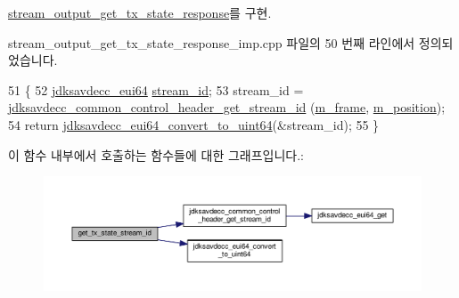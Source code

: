 \hyperlink{classavdecc__lib_1_1stream__output__get__tx__state__response_a70413bbd0422049658122c5103e0d948}{stream\+\_\+output\+\_\+get\+\_\+tx\+\_\+state\+\_\+response}를 구현.



stream\+\_\+output\+\_\+get\+\_\+tx\+\_\+state\+\_\+response\+\_\+imp.\+cpp 파일의 50 번째 라인에서 정의되었습니다.


\begin{DoxyCode}
51 \{
52     \hyperlink{structjdksavdecc__eui64}{jdksavdecc\_eui64} \hyperlink{avtp_8h_af5af7b461263e29ceb91a8d3a8bc2c97}{stream\_id};
53     stream\_id = \hyperlink{group__jdksavdecc__avtp__common__control__header_ga99181000ee374936c8518f657fa9f5cd}{jdksavdecc\_common\_control\_header\_get\_stream\_id}
      (\hyperlink{classavdecc__lib_1_1stream__output__get__tx__state__response__imp_a50417969cf438e7c8d698726bbbe2ff9}{m\_frame}, \hyperlink{classavdecc__lib_1_1stream__output__get__tx__state__response__imp_af5e691c4a8a0feb07f48440b321206cd}{m\_position});
54     \textcolor{keywordflow}{return} \hyperlink{group__eui64_ga1c9a3634faa4bec90dea5a52e691bf63}{jdksavdecc\_eui64\_convert\_to\_uint64}(&stream\_id);
55 \}
\end{DoxyCode}


이 함수 내부에서 호출하는 함수들에 대한 그래프입니다.\+:
\nopagebreak
\begin{figure}[H]
\begin{center}
\leavevmode
\includegraphics[width=350pt]{classavdecc__lib_1_1stream__output__get__tx__state__response__imp_a56f583db065602dd071cac501aae0c20_cgraph}
\end{center}
\end{figure}


